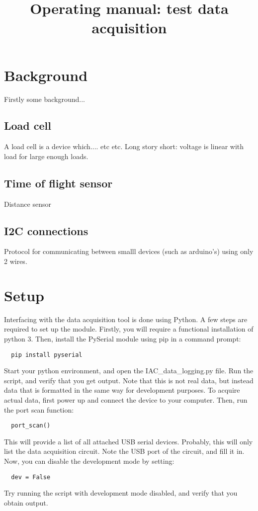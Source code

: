 \documentclass{article}
\title{Operating manual: test data acquisition}
\begin{document}
\maketitle
 \section{Background}
 Firstly some background...
 \subsection{Load cell}
 A load cell is a device which.... etc etc. Long story short: voltage is linear with load for large enough loads.
 \subsection{Time of flight sensor}
 Distance sensor
 \subsection{I2C connections}
 Protocol for communicating between smalll devices (such as arduino's) using only 2 wires.

 \section{Setup}
 Interfacing with the data acquisition tool is done using Python. A few steps are required to set up the module. Firstly, you will require a functional installation of python 3. Then, install the PySerial module using pip in a command prompt:
 \begin{lstlisting}
  pip install pyserial
 \end{lstlisting}
 Start your python environment, and open the IAC\_data\_logging.py file. Run the script, and verify that you get output. Note that this is not real data, but instead data that is formatted in the same way for development purposes. To acquire actual data, first power up and connect the device to your computer. Then, run the port scan function:
 \begin{lstlisting}
  port_scan()
 \end{lstlisting}
 This will provide a list of all attached USB serial devices. Probably, this will only list the data acquisition circuit. Note the USB port of the circuit, and fill it in. Now, you can disable the development mode by setting:
 \begin{lstlisting}
  dev = False
 \end{lstlisting}
 Try running the script with development mode disabled, and verify that you obtain output.
\end{document}
